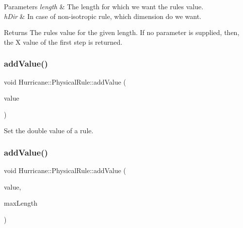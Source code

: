 \begin{DoxyParams}{Parameters}
{\em length} & The length for which we want the rule\textquotesingle{}s value. \\
\hline
{\em h\+Dir} & In case of non-\/isotropic rule, which dimension do we want. \\
\hline
\end{DoxyParams}
\begin{DoxyReturn}{Returns}
The rule\textquotesingle{}s value for the given length. If no parameter is supplied, then, the X value of the first step is returned. 
\end{DoxyReturn}
\mbox{\label{classHurricane_1_1PhysicalRule_ada08351fb24f36a63f4e3a3c524000a2}} 
\subsubsection{\texorpdfstring{add\+Value()}{addValue()}\hspace{0.1cm}{\footnotesize\ttfamily [1/3]}}
{\footnotesize\ttfamily void Hurricane\+::\+Physical\+Rule\+::add\+Value (\begin{DoxyParamCaption}\item[{double}]{value }\end{DoxyParamCaption})\hspace{0.3cm}{\ttfamily [inline]}}

Set the {\ttfamily double} value of a rule. \mbox{\label{classHurricane_1_1PhysicalRule_ac25990fc4aff5e5739ae9632f43d9bf8}} 
\subsubsection{\texorpdfstring{add\+Value()}{addValue()}\hspace{0.1cm}{\footnotesize\ttfamily [2/3]}}
{\footnotesize\ttfamily void Hurricane\+::\+Physical\+Rule\+::add\+Value (\begin{DoxyParamCaption}\item[{\mbox{\hyperlink{group__DbUGroup_ga4fbfa3e8c89347af76c9628ea06c4146}{Hurricane\+::\+Db\+U\+::\+Unit}}}]{value,  }\item[{\mbox{\hyperlink{group__DbUGroup_ga4fbfa3e8c89347af76c9628ea06c4146}{Hurricane\+::\+Db\+U\+::\+Unit}}}]{max\+Length }\end{DoxyParamCaption})\hspace{0.3cm}{\ttfamily [inline]}}


